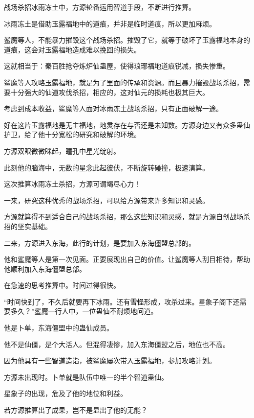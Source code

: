 
\begin{this_body}

战场杀招冰雨冻土中，方源轮番运用智道手段，不断进行推算。

冰雨冻土是借助玉露福地中的道痕，并非是临时道痕，所以更加麻烦。

鲨魔等人，不能暴力摧毁这个战场杀招。摧毁了它，就等于破坏了玉露福地本身的道痕，这会对玉露福地造成难以挽回的损失。

这就相当于：秦百胜抢夺炼炉仙蛊屋，使得琅琊福地道痕锐减，损失惨重。

鲨魔等人攻略玉露福地，就是为了里面的传承和资源。而且暴力摧毁战场杀招，需要十分强大的仙道攻伐杀招，相应的，这对仙元的损耗也极其巨大。

考虑到成本收益，鲨魔等人面对冰雨冻土战场杀招，只有正面破解一途。

好在这片玉露福地是无主福地，地灵存在与否还是未知数。方源身边又有众多蛊仙护卫，给了他十分宽松的研究和破解的环境。

方源双眼微微眯起，瞳孔中星光绽射。

此刻他的脑海中，无数的星念此起彼伏，不断旋转碰撞，极速演算。

这次推算冰雨冻土杀招，方源可谓竭尽心力！

一来，研究这种优秀的战场杀招，可以给方源带来许多知识和灵感。

方源就算得不到适合自己的战场杀招，那么这些知识和灵感，就是方源自创战场杀招的坚实基础。

二来，方源进入东海，此行的计划，是要加入东海僵盟总部的。

他和鲨魔等人是第一次见面。正要展现出自己的价值。让鲨魔等人刮目相待，帮助他顺利加入东海僵盟总部。

在急速的思考推算中。时间过得很快。

“时间快到了，不久后就要再下冰雨。还有雪怪形成，攻杀过来。星象子阁下还需要多久？”鲨魔一行人中，一位蛊仙不耐烦地问道。

他是卜单，东海僵盟中的蛊仙成员。

他不是仙僵，是个大活人。但混得凄惨，加入东海僵盟之后，地位也不高。

因为他具有一些智道造诣，被鲨魔屡次带入玉露福地，参加攻略计划。

方源未出现时。卜单就是队伍中唯一的半个智道蛊仙。

星象子的出现，危及了他的地位和利益。

若方源推算出了成果，岂不是显出了他的无能？


\end{this_body}
